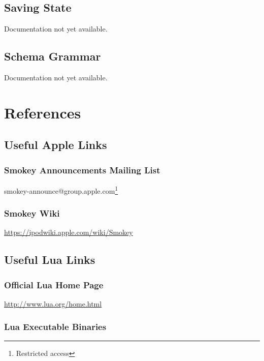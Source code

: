 \subsection{Saving State}

Documentation not yet available.

\subsection{Schema Grammar}

Documentation not yet available.


\section{References}

\subsection{Useful Apple Links}
\label{sec:AppleLinks}

\subsubsection{Smokey Announcements Mailing List}

smokey-announce@group.apple.com\footnote{Restricted access\label{fn:Restricted}}

\subsubsection{Smokey Wiki}

\url{https://ipodwiki.apple.com/wiki/Smokey}

\subsection{Useful Lua Links}
\label{sec:LuaLinks}

\subsubsection{Official Lua Home Page}

\url{http://www.lua.org/home.html}

\subsubsection{Lua Executable Binaries}

